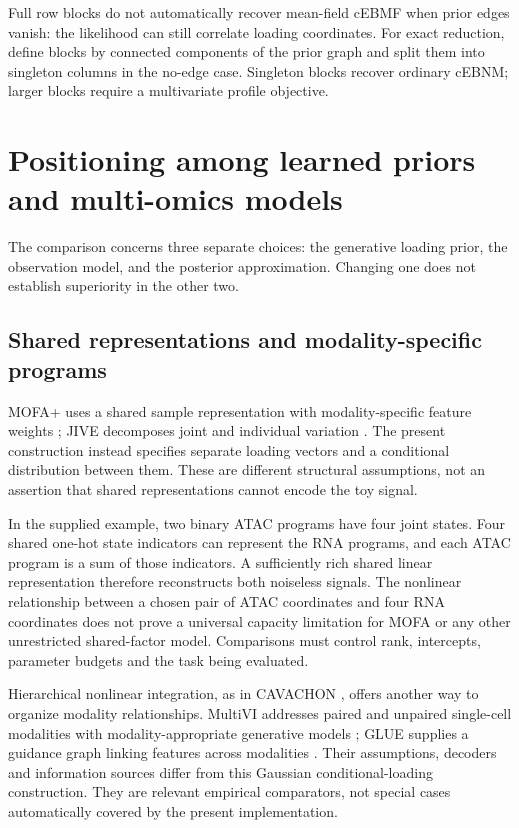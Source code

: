 \documentclass[11pt,a4paper]{article}
\begin{document}
Full row blocks do not automatically recover mean-field cEBMF when prior
edges vanish: the likelihood can still correlate loading coordinates.
For exact reduction, define blocks by connected components of the prior
graph and split them into singleton columns in the no-edge case.
Singleton blocks recover ordinary cEBNM; larger blocks require a
multivariate profile objective.



\clearpage
\section{Positioning among learned priors and multi-omics models}
\label{sec:comparison}
The comparison concerns three separate choices: the generative loading
prior, the observation model, and the posterior approximation. Changing one
does not establish superiority in the other two.



\subsection{Shared representations and modality-specific programs}
MOFA+ uses a shared sample representation with modality-specific feature
weights \cite{mofa}; JIVE decomposes joint and individual variation
\cite{jive}. The present construction instead specifies separate loading
vectors and a conditional distribution between them. These are different
structural assumptions, not an assertion that shared representations cannot
encode the toy signal.

In the supplied example, two binary ATAC programs have four joint states.
Four shared one-hot state indicators can represent the RNA programs, and
each ATAC program is a sum of those indicators. A sufficiently rich shared
linear representation therefore reconstructs both noiseless signals.
The nonlinear relationship between a chosen pair of ATAC coordinates and
four RNA coordinates does not prove a universal capacity limitation for
MOFA or any other unrestricted shared-factor model. Comparisons must control
rank, intercepts, parameter budgets and the task being evaluated.

Hierarchical nonlinear integration, as in CAVACHON \cite{cavachon}, offers
another way to organize modality relationships. MultiVI addresses paired
and unpaired single-cell modalities with modality-appropriate generative
models \cite{multivi}; GLUE supplies a guidance graph linking features
across modalities \cite{glue}. Their assumptions, decoders and information
sources differ from this Gaussian conditional-loading construction.
They are relevant empirical comparators, not special cases automatically
covered by the present implementation.
\end{document}
